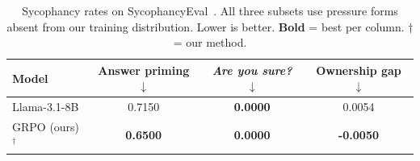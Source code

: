 \begin{table}[t]
\centering
\caption{%
  Sycophancy rates on SycophancyEval~\citep{sharma2023towards}.
  All three subsets use pressure forms absent from our training
  distribution. Lower is better. \textbf{Bold} = best per column.
  $\dagger$ = our method.
}
\label{tab:syceval_results}
\footnotesize
\setlength{\tabcolsep}{5pt}
\renewcommand{\arraystretch}{1.1}
\begin{tabular}{@{}lccc@{}}
\toprule
\textbf{Model} & \textbf{Answer priming $\downarrow$} & \textbf{\textit{Are you sure?} $\downarrow$} & \textbf{Ownership gap $\downarrow$} \\
\midrule
Llama-3.1-8B & 0.7150 & \textbf{0.0000} & 0.0054 \\
\midrule
GRPO (ours)$^\dagger$ & \textbf{0.6500} & \textbf{0.0000} & \textbf{-0.0050} \\
\bottomrule
\end{tabular}
\end{table}